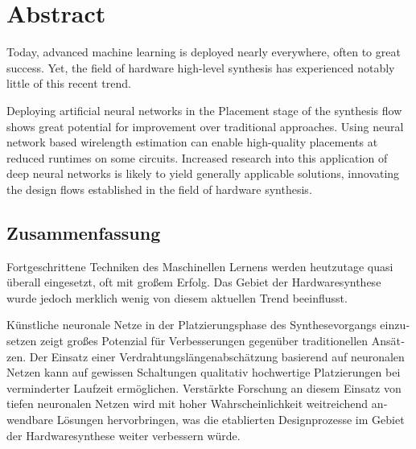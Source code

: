 
\begingroup
\let\clearpage\relax
\let\cleardoublepage\relax
\let\cleardoublepage\relax

\chapter*{Abstract}

Today, advanced machine learning is deployed nearly everywhere, often to great success. Yet, the field of hardware high-level synthesis has experienced notably little of this recent trend. 

Deploying artificial neural networks in the Placement stage of the synthesis flow shows great potential for improvement over traditional approaches. Using neural network based wirelength estimation can enable high-quality placements at reduced runtimes on some circuits. Increased research into this application of deep neural networks is likely to yield generally applicable solutions, innovating the design flows established in the field of hardware synthesis.

\vfill

\begin{otherlanguage}{ngerman}
\chapter*{Zusammenfassung}

Fortgeschrittene Techniken des Maschinellen Lernens werden heutzutage quasi überall eingesetzt, oft mit großem Erfolg. Das Gebiet der Hardwaresynthese wurde jedoch merklich wenig von diesem aktuellen Trend beeinflusst.

Künstliche neuronale Netze in der Platzierungsphase des Synthesevorgangs einzusetzen zeigt großes Potenzial für Verbesserungen gegenüber traditionellen Ansätzen. Der Einsatz einer Verdrahtungslängenabschätzung basierend auf neuronalen Netzen kann auf gewissen Schaltungen qualitativ hochwertige Platzierungen bei verminderter Laufzeit ermöglichen. Verstärkte Forschung an diesem Einsatz von tiefen neuronalen Netzen wird mit hoher Wahrscheinlichkeit weitreichend anwendbare Lösungen hervorbringen, was die etablierten Designprozesse im Gebiet der Hardwaresynthese weiter verbessern würde.

\end{otherlanguage}

\endgroup

\vfill
